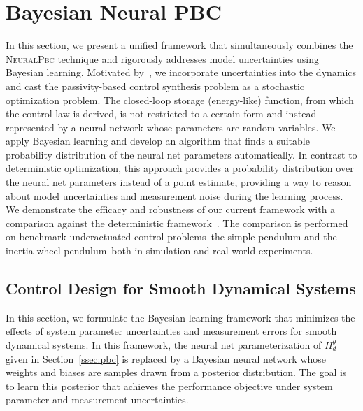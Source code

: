 
\section{Bayesian Neural PBC}

In this section, we present a unified framework that simultaneously combines
the \textsc{NeuralPbc} technique and rigorously addresses model uncertainties using
Bayesian learning.
%
Motivated by~\cite{sirichotiyakul2020data}, we incorporate uncertainties into
the dynamics and cast the passivity-based control synthesis problem as a
stochastic optimization problem.
%
The closed-loop storage (energy-like) function, from which the control law is
derived, is not restricted to a certain form and instead represented by a neural
network whose parameters are random variables.
%
%
We apply Bayesian learning and develop an algorithm that finds a suitable
probability distribution of the neural net parameters automatically.
%
In contrast to deterministic optimization, this approach provides a probability
distribution over the neural net parameters instead of a point estimate,
providing a way to reason about model uncertainties and measurement noise during
the learning process.
%
We demonstrate the efficacy and robustness of our current framework with a
comparison against the deterministic framework~\cite{sirichotiyakul2020data}.
The comparison is performed on benchmark underactuated control problems--the
simple pendulum and the inertia wheel pendulum--both in simulation and
real-world experiments. 
%

\subsection{Control Design for Smooth Dynamical Systems}
\label{ssec:pbc_smooth_dynamics}

In this section, we formulate the Bayesian learning framework that minimizes
the effects of system parameter uncertainties and measurement errors for smooth dynamical systems. 
%
In this framework, the neural net parameterization of $H^\theta_d$ given in
Section~\ref{ssec:pbc} is replaced by a Bayesian neural
network whose weights and biases are samples drawn from a posterior distribution.
%
The goal is to learn this posterior that achieves the performance objective
under system parameter and measurement uncertainties. 
%


